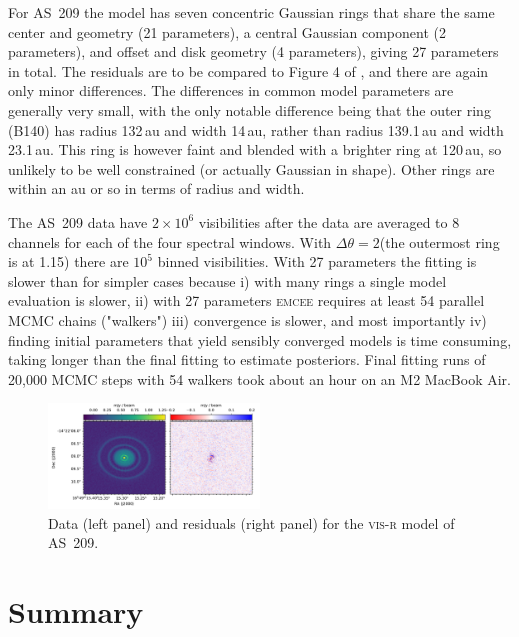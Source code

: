 \documentclass[fleqn,usenatbib]{mnras}
\begin{document}
For AS~209 the model has seven concentric Gaussian rings that share the same center and geometry (21 parameters), a central Gaussian component (2 parameters), and offset and disk geometry (4 parameters), giving 27 parameters in total. The residuals are to be compared to Figure 4 of \citet{2018ApJ...869L..48G}, and there are again only minor differences. The differences in common model parameters are generally very small, with the only notable difference being that the outer ring (B140) has radius 132\,au and width 14\,au, rather than radius 139.1\,au and width 23.1\,au. This ring is however faint and blended with a brighter ring at 120\,au, so unlikely to be well constrained (or actually Gaussian in shape). Other rings are within an au or so in terms of radius and width.

The AS~209 data have $2 \times 10^6$ visibilities after the data are averaged to 8 channels for each of the four spectral windows. With $\Delta \theta = 2$\arcsec (the outermost ring is at 1.15\arcsec) there are $10^5$ binned visibilities. With 27 parameters the fitting is slower than for simpler cases because i) with many rings a single model evaluation is slower, ii) with 27 parameters \textsc{emcee} requires at least 54 parallel MCMC chains ("walkers") iii) convergence is slower, and most importantly iv) finding initial parameters that yield sensibly converged models is time consuming, taking longer than the final fitting to estimate posteriors. Final fitting runs of 20,000 MCMC steps with 54 walkers took about an hour on an M2 MacBook Air.

\begin{figure}
    \centering
    \hspace{-0.5cm}\includegraphics[width=0.5\textwidth]{doc/resid_as209.pdf}
    \caption{Data (left panel) and residuals (right panel) for the \textsc{vis-r} model of AS~209.}
    \label{fig:as209resid}
\end{figure}

\section{Summary}
\end{document}
